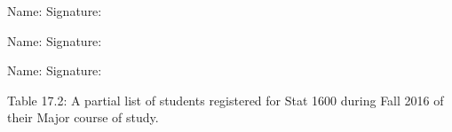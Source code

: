 \documentclass[11pt, chapterprefix=true]{scrbook}\usepackage[]{graphicx}\usepackage[]{color}
\begin{document}
\begin{exercises}
\begin{exercise}
\begin{center}
{{\vspace{4mm}
Name: \underline{\phantom{xxxxxxxxxxxxxxxxxxxxxxxx}} Signature: \underline{\phantom{xxxxxxxxxxxxxxxxxxxxxxxx}}

\vspace{4mm}
Name: \underline{\phantom{xxxxxxxxxxxxxxxxxxxxxxxx}} Signature: \underline{\phantom{xxxxxxxxxxxxxxxxxxxxxxxx}}

\vspace{4mm}
Name: \underline{\phantom{xxxxxxxxxxxxxxxxxxxxxxxx}} Signature: \underline{\phantom{xxxxxxxxxxxxxxxxxxxxxxxx}}
 }}
\end{center}

\begin{minipage}[ht]{9cm}

{\small{
Table 17.2: A partial list of students registered for Stat 1600 during Fall 2016 of their Major course of study.

}}
\end{minipage}
\end{exercise}
\end{exercises}
\end{document}
